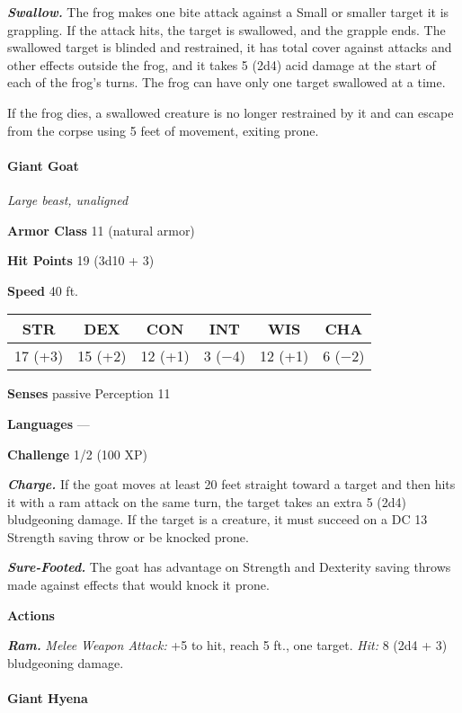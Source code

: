 \documentclass[
]{article}
\begin{document}
\emph{\textbf{Swallow.}} The frog makes one bite attack against a Small
or smaller target it is grappling. If the attack hits, the target is
swallowed, and the grapple ends. The swallowed target is blinded and
restrained, it has total cover against attacks and other effects outside
the frog, and it takes 5 (2d4) acid damage at the start of each of the
frog's turns. The frog can have only one target swallowed at a time.

If the frog dies, a swallowed creature is no longer restrained by it and
can escape from the corpse using 5 feet of movement, exiting prone.

\hypertarget{giant-goat}{%
\paragraph{Giant Goat}\label{giant-goat}}

\emph{Large beast, unaligned}

\textbf{Armor Class} 11 (natural armor)

\textbf{Hit Points} 19 (3d10 + 3)

\textbf{Speed} 40 ft.

\begin{longtable}[]{@{}cccccc@{}}
\toprule
STR & DEX & CON & INT & WIS & CHA\tabularnewline
\midrule
\endhead
17 (+3) & 15 (+2) & 12 (+1) & 3 (−4) & 12 (+1) & 6 (−2)\tabularnewline
\bottomrule
\end{longtable}

\textbf{Senses} passive Perception 11

\textbf{Languages} ---

\textbf{Challenge} 1/2 (100 XP)

\emph{\textbf{Charge.}} If the goat moves at least 20 feet straight
toward a target and then hits it with a ram attack on the same turn, the
target takes an extra 5 (2d4) bludgeoning damage. If the target is a
creature, it must succeed on a DC 13 Strength saving throw or be knocked
prone.

\emph{\textbf{Sure-Footed.}} The goat has advantage on Strength and
Dexterity saving throws made against effects that would knock it prone.

\textbf{Actions}

\emph{\textbf{Ram.}} \emph{Melee Weapon Attack:} +5 to hit, reach 5 ft.,
one target. \emph{Hit:} 8 (2d4 + 3) bludgeoning damage.

\hypertarget{giant-hyena}{%
\paragraph{Giant Hyena}\label{giant-hyena}}
\end{document}
